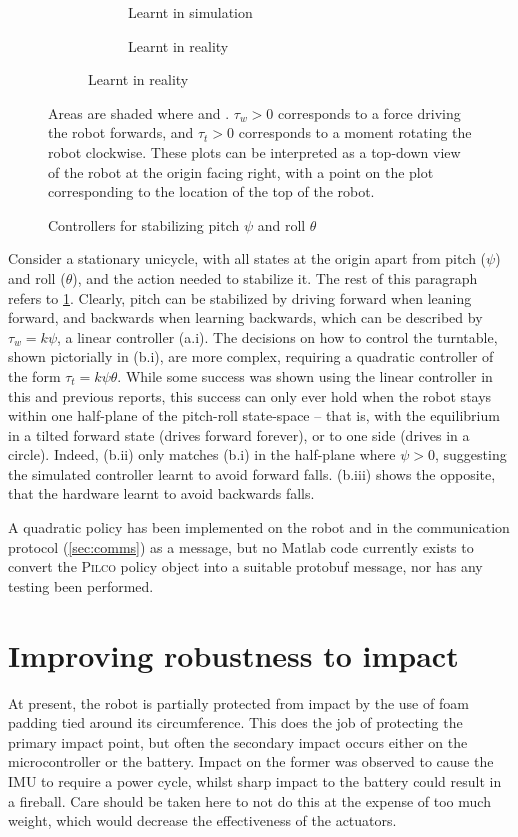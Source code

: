 \documentclass[main.tex]{subfiles}
\begin{document}
\begin{figure}[b!]
\begin{subfigure}[t]{\linewidth}
			\begin{subfigure}{(\linewidth - 2\ctlpadding)/3}
				\caption{Learnt in simulation}
			\end{subfigure}\hfill
			\begin{subfigure}{(\linewidth - 2\ctlpadding)/3}
				\caption{Learnt in reality}
			\end{subfigure}
		\end{subfigure}
		\caption{Controllers for stabilizing pitch $\psi$ and roll $\theta$}
		\label{fig:balancing}
		\medskip
		\small
		Areas are shaded where  and .
		$\tau_w > 0$ corresponds to a force driving the robot forwards, and $\tau_t > 0$ corresponds to a moment rotating the robot clockwise.
		These plots can be interpreted as a top-down view of the robot at the origin facing right, with a point on the plot corresponding to the location of the top of the robot.
	\end{figure}

	Consider a stationary unicycle, with all states at the origin apart from pitch ($\psi$) and roll ($\theta$), and the action needed to stabilize it.
	The rest of this paragraph refers to \cref{fig:balancing}.
	Clearly, pitch can be stabilized by driving forward when leaning forward, and backwards when learning backwards, which can be described by $\tau_w = k\psi$, a linear controller (a.i).
	The decisions on how to control the turntable, shown pictorially in (b.i), are more complex, requiring a quadratic controller of the form $\tau_t = k\psi\theta$.
	While some success was shown using the linear controller in this and previous reports, this success can only ever hold when the robot stays within one half-plane of the pitch-roll state-space -- that is, with the equilibrium in a tilted forward state (drives forward forever), or to one side (drives in a circle).
	Indeed, (b.ii) only matches (b.i) in the half-plane where $\psi > 0$, suggesting the simulated controller learnt to avoid forward falls. (b.iii) shows the opposite, that the hardware learnt to avoid backwards falls.

	A quadratic policy has been implemented on the robot and in the communication protocol (\cref{sec:comms}) as a  message, but no Matlab code currently exists to convert the \textsc{Pilco} policy object into a suitable protobuf message, nor has any testing been performed.

\section{Improving robustness to impact}

	At present, the robot is partially protected from impact by the use of foam padding tied around its circumference.
	This does the job of protecting the primary impact point, but often the secondary impact occurs either on the microcontroller or the battery. Impact on the former was observed to cause the IMU to require a power cycle, whilst sharp impact to the battery could result in a fireball.
	Care should be taken here to not do this at the expense of too much weight, which would decrease the effectiveness of the actuators. 
\end{document}
